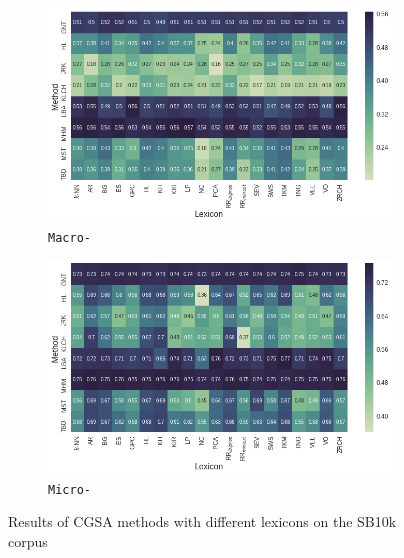 \begin{figure}
{
\centering
\begin{subfigure}{.5\textwidth}
  \centering
  \includegraphics[width=\linewidth]{img/cgsa_sb10k_macro_lexicons.png}
  \caption{\texttt{Macro-\F}}\label{cgsa:fig:sb10k-lexicon-macro}
\end{subfigure}%
\begin{subfigure}{.5\textwidth}
  \centering
  \includegraphics[width=\linewidth]{img/cgsa_sb10k_micro_lexicons.png}
  \caption{\texttt{Micro-\F}}\label{cgsa:fig:sb10k-lexicon-micro}
\end{subfigure}
}
\caption[SB10k Results with Different Lexicons]{Results of CGSA
  methods with different lexicons on the SB10k
  corpus}\label{cgsa:fig:sb10k-lexicon-effect}
\end{figure}


